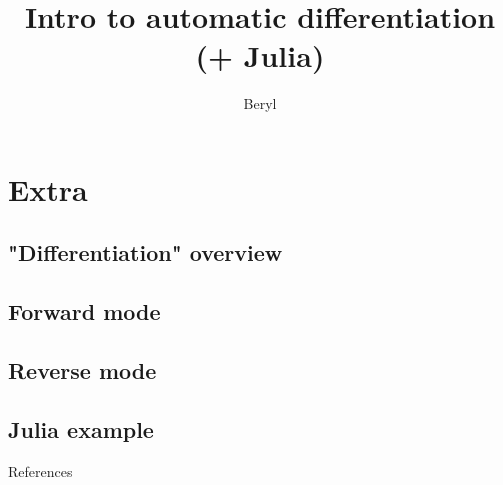 \documentclass{beamer}
\begin{document}
\section{Extra}
\title{Intro to automatic differentiation ({\color{red}+ Julia})}
\author{Beryl}
\begin{frame}
\maketitle
\end{frame}

\subsection{"Differentiation" overview}
\subsection{Forward mode}
\subsection{Reverse mode}
\subsection{Julia example}


\begin{frame}{References}
    
\end{frame}
\end{document}
